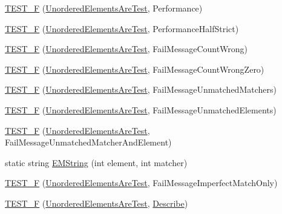 \begin{DoxyCompactItemize}
\hyperlink{namespacetesting_1_1gmock__matchers__test_a074ca2babea203d1a54d69ff1fde5c59}{T\+E\+S\+T\+\_\+F} (\hyperlink{classtesting_1_1gmock__matchers__test_1_1UnorderedElementsAreTest}{Unordered\+Elements\+Are\+Test}, Performance)
\item 
\hyperlink{namespacetesting_1_1gmock__matchers__test_a4437de9d40efd87f73b738ef38c2d70f}{T\+E\+S\+T\+\_\+F} (\hyperlink{classtesting_1_1gmock__matchers__test_1_1UnorderedElementsAreTest}{Unordered\+Elements\+Are\+Test}, Performance\+Half\+Strict)
\item 
\hyperlink{namespacetesting_1_1gmock__matchers__test_a5dd3b28b540c1ef01e623f840c48e7b4}{T\+E\+S\+T\+\_\+F} (\hyperlink{classtesting_1_1gmock__matchers__test_1_1UnorderedElementsAreTest}{Unordered\+Elements\+Are\+Test}, Fail\+Message\+Count\+Wrong)
\item 
\hyperlink{namespacetesting_1_1gmock__matchers__test_a7dc8c467fe0d6f26c0ee643be56eb590}{T\+E\+S\+T\+\_\+F} (\hyperlink{classtesting_1_1gmock__matchers__test_1_1UnorderedElementsAreTest}{Unordered\+Elements\+Are\+Test}, Fail\+Message\+Count\+Wrong\+Zero)
\item 
\hyperlink{namespacetesting_1_1gmock__matchers__test_a11b785087491ae58b074fa8dbbc88cd4}{T\+E\+S\+T\+\_\+F} (\hyperlink{classtesting_1_1gmock__matchers__test_1_1UnorderedElementsAreTest}{Unordered\+Elements\+Are\+Test}, Fail\+Message\+Unmatched\+Matchers)
\item 
\hyperlink{namespacetesting_1_1gmock__matchers__test_a6dfb50dcbb543de71fcc4d09844d36b3}{T\+E\+S\+T\+\_\+F} (\hyperlink{classtesting_1_1gmock__matchers__test_1_1UnorderedElementsAreTest}{Unordered\+Elements\+Are\+Test}, Fail\+Message\+Unmatched\+Elements)
\item 
\hyperlink{namespacetesting_1_1gmock__matchers__test_a2395b7e71b7ad50af72caa61c10e6898}{T\+E\+S\+T\+\_\+F} (\hyperlink{classtesting_1_1gmock__matchers__test_1_1UnorderedElementsAreTest}{Unordered\+Elements\+Are\+Test}, Fail\+Message\+Unmatched\+Matcher\+And\+Element)
\item 
static string \hyperlink{namespacetesting_1_1gmock__matchers__test_a5ec14aa1e31cb496e5366f583e29dfeb}{E\+M\+String} (int element, int matcher)
\item 
\hyperlink{namespacetesting_1_1gmock__matchers__test_ac70f9f9717f35352349b076654094f6a}{T\+E\+S\+T\+\_\+F} (\hyperlink{classtesting_1_1gmock__matchers__test_1_1UnorderedElementsAreTest}{Unordered\+Elements\+Are\+Test}, Fail\+Message\+Imperfect\+Match\+Only)
\item 
\hyperlink{namespacetesting_1_1gmock__matchers__test_a937f4d835023cd6322eb7d32596f3f43}{T\+E\+S\+T\+\_\+F} (\hyperlink{classtesting_1_1gmock__matchers__test_1_1UnorderedElementsAreTest}{Unordered\+Elements\+Are\+Test}, \hyperlink{namespacetesting_1_1gmock__matchers__test_a36ae44e4f6c8e9fe3fe9162132503717}{Describe})

\end{DoxyCompactItemize}
